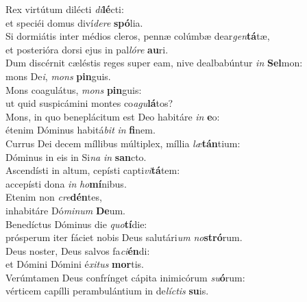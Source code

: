 \oddverse Rex virtútum dilécti \textit{di}\textbf{lé}cti:~\*\\
\oddverse et speciéi domus diví\textit{de}\textit{re} \textbf{spó}lia.\\
\evenverse Si dormiátis inter médios cleros, pennæ colúmbæ dear\textit{gen}\textbf{tá}tæ,~\*\\
\evenverse et posterióra dorsi ejus in pal\textit{ló}\textit{re} \textbf{au}ri.\\
\oddverse Dum discérnit cæléstis reges super eam, nive dealbabúntur \textit{in} \textbf{Sel}mon:~\*\\
\oddverse mons De\textit{i}, \textit{mons} \textbf{pin}guis.\\
\evenverse Mons coagulátus, \textit{mons} \textbf{pin}guis:~\*\\
\evenverse ut quid suspicámini montes co\textit{a}\textit{gu}\textbf{lá}tos?\\
\oddverse Mons, in quo beneplácitum est Deo habitáre \textit{in} \textbf{e}o:~\*\\
\oddverse étenim Dóminus habitá\textit{bit} \textit{in} \textbf{fi}nem.\\
\evenverse Currus Dei decem míllibus múltiplex, míllia \textit{læ}\textbf{tán}tium:~\*\\
\evenverse Dóminus in eis in Si\textit{na} \textit{in} \textbf{san}cto.\\
\oddverse Ascendísti in altum, cepísti capti\textit{vi}\textbf{tá}tem:~\*\\
\oddverse accepísti dona \textit{in} \textit{ho}\textbf{mí}nibus.\\
\evenverse Etenim non \textit{cre}\textbf{dén}tes,~\*\\
\evenverse inhabitáre Dó\textit{mi}\textit{num} \textbf{De}um.\\
\oddverse Benedíctus Dóminus die \textit{quo}\textbf{tí}die:~\*\\
\oddverse prósperum iter fáciet nobis Deus salutári\textit{um} \textit{no}\textbf{stró}rum.\\
\evenverse Deus noster, Deus salvos fa\textit{ci}\textbf{én}di:~\*\\
\evenverse et Dómini Dómini é\textit{xi}\textit{tus} \textbf{mor}tis.\\
\oddverse Verúmtamen Deus confrínget cápita inimicórum \textit{su}\textbf{ó}rum:~\*\\
\oddverse vérticem capílli perambulántium in de\textit{lí}\textit{ctis} \textbf{su}is.\\
